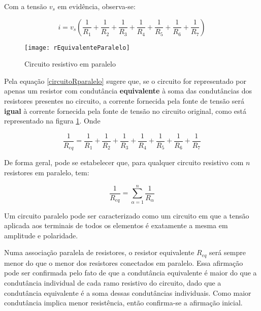 \documentclass[12pt,fleqn]{book} %
\begin{document}
Com a tensão $v_s$ em evidência, observa-se:

\begin{equation}\label{rEquivalenteParalelo}
i= v_s(\frac{1}{R_1} + \frac{1}{R_2} +\frac{1}{R_3} +\frac{1}{R_4} +\frac{1}{R_5} +\frac{1}{R_6} +\frac{1}{R_7})
\end{equation}

\begin{figure}[!htbp] \centering\texttt{[image: rEquivalenteParalelo]}
            \caption{Circuito resistivo em paralelo}\label{rEquivalenteParalelo} 
        \end{figure}

Pela equação \ref{circuitoRparalelo} sugere que, se o circuito for representado por apenas um resistor com condutância \textbf{equivalente} à soma das condutâncias dos resistores presentes no circuito, a corrente fornecida pela fonte de tensão será \textbf{igual} à corrente fornecida pela fonte de tensão no circuito original, como está representado na figura \ref{rEquivalenteParalelo}. Onde

\begin{equation}
\frac{1}{R_{eq}} = \frac{1}{R_1} + \frac{1}{R_2} +\frac{1}{R_3} +\frac{1}{R_4} +\frac{1}{R_5} +\frac{1}{R_6} +\frac{1}{R_7}
\end{equation}

De forma geral, pode se estabelecer que, para qualquer circuito resistivo com $n$ resistores em paralelo, tem:

\begin{equation}
\frac{1}{R_{eq}} = \sum\limits_{\alpha = 1}^{n} \frac{1}{R_\alpha}
\end{equation}

\begin{remark}
Um circuito paralelo pode ser caracterizado como um circuito em que a tensão aplicada aos terminais de todos os elementos é exatamente a mesma em amplitude e polaridade.
\end{remark}

\begin{remark}
Numa associação paralela de resistores, o resistor equivalente $R_{eq}$ será sempre menor do que o menor dos resistores conectados em paralelo. Essa afirmação pode ser confirmada pelo fato de que a condutância equivalente é maior do que a condutância individual de cada ramo resistivo do circuito, dado que a condutância equivalente é a soma dessas condutâncias individuais. Como maior condutância implica menor resistência, então confirma-se a afirmação inicial.
\end{remark}
\end{document}
